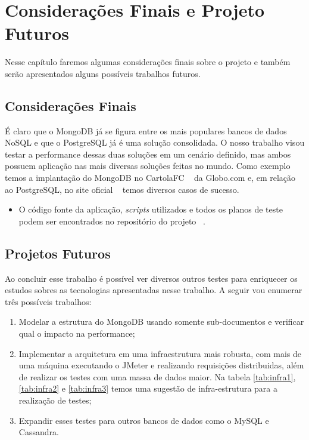 \chapter{Considerações Finais e Projeto Futuros}

Nesse capítulo faremos algumas considerações finais sobre o projeto e também serão apresentados alguns possíveis trabalhos futuros.

\section{Considerações Finais}

É claro que o MongoDB já se figura entre os mais populares bancos de dados NoSQL e que o PostgreSQL já é uma solução consolidada. O nosso trabalho visou testar a performance dessas duas soluções em um cenário definido, mas ambos possuem aplicação nas mais diversas soluções feitas no mundo. Como exemplo temos a implantação do MongoDB no CartolaFC ~\cite{mongocartola} da Globo.com e, em relação ao PostgreSQL, no site oficial ~\cite{usecasepostgresql}  temos diversos casos de sucesso.

\begin{itemize}
	\item O código fonte da aplicação, \textit{scripts} utilizados e todos os planos de teste podem ser encontrados no repositório do projeto ~\cite{github}.
\end{itemize}

\section{Projetos Futuros}

Ao concluir esse trabalho é possível ver diversos outros testes para enriquecer os estudos sobres as tecnologias apresentadas nesse trabalho. A seguir vou enumerar três possíveis trabalhos:

\begin{enumerate}
\item Modelar a estrutura do MongoDB usando somente sub-documentos e verificar qual o impacto na performance;
\item Implementar a arquitetura em uma infraestrutura mais robusta, com mais de uma máquina executando o JMeter e realizando requisições distribuidas, além de realizar os testes com uma massa de dados maior. Na tabela \ref{tab:infra1}, \ref{tab:infra2} e \ref{tab:infra3} temos uma sugestão de infra-estrutura para a realização de testes;
\item Expandir esses testes para outros bancos de dados como o MySQL e Cassandra.
\end{enumerate}

